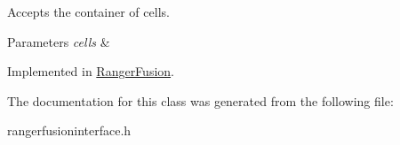 Accepts the container of cells. 


\begin{DoxyParams}{Parameters}
{\em cells} & \\
\hline
\end{DoxyParams}


Implemented in \hyperlink{class_ranger_fusion_ae3128f8cc8f4cb955d8db661aefba3dc}{Ranger\+Fusion}.



The documentation for this class was generated from the following file\+:\begin{DoxyCompactItemize}
\item 
rangerfusioninterface.\+h\end{DoxyCompactItemize}
